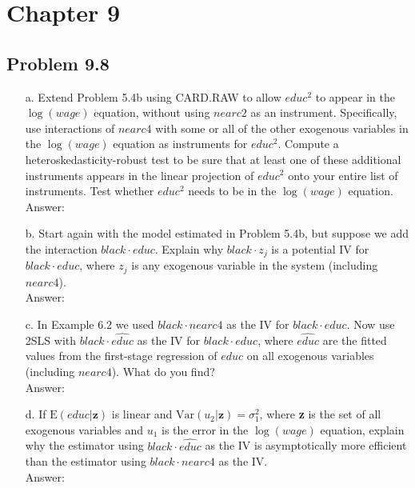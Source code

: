 \documentclass[10pt]{article}
\newcommand{\E}{\text{E}}
\newcommand{\V}{\text{Var}}
\begin{document}
\section*{Chapter 9}
\subsection*{Problem 9.8}
\begin{enumerate}
\item[a.] Extend Problem 5.4b using CARD.RAW to allow $educ^2$ to appear in the $\log(wage)$ equation, without using $nearc2$ as an instrument. Specifically, use interactions of $nearc4$ with some or all of the other exogenous variables in the $\log(wage)$ equation as instruments for $educ^2$. Compute a heteroskedasticity-robust test to be sure that at least one of these additional instruments appears in the linear projection of $educ^2$ onto your entire list of instruments. Test whether $educ^2$ needs to be in the $\log(wage)$ equation. 
\\ Answer:\\

\item[b.] Start again with the model estimated in Problem 5.4b, but suppose we add the interaction $black\cdot educ$. Explain why $black\cdot z_j$ is a potential IV for $black\cdot educ$, where $z_j$ is any exogenous variable in the system (including $nearc4$). 
\\ Answer:\\

\item[c.] In Example 6.2 we used $black\cdot nearc4$ as the IV for $black\cdot educ$. Now use 2SLS with $black\cdot\hat{educ}$ as the IV for $black\cdot educ$, where $\hat{educ}$ are the fitted values from the first-stage regression of $educ$ on all exogenous variables (including $nearc4$). What do you find? 
\\ Answer:\\

\item[d.] If $\E(educ|\textbf{z})$ is linear and $\V(u_2|\textbf{z})=\sigma_1^2$, where \textbf{z} is the set of all exogenous variables and $u_1$ is the error in the $\log(wage)$ equation, explain why the estimator using $black\cdot\hat{educ}$ as the IV is asymptotically more efficient than the estimator using $black\cdot nearc4$ as the IV.
\\ Answer:\\

\end{enumerate}
\end{document}
